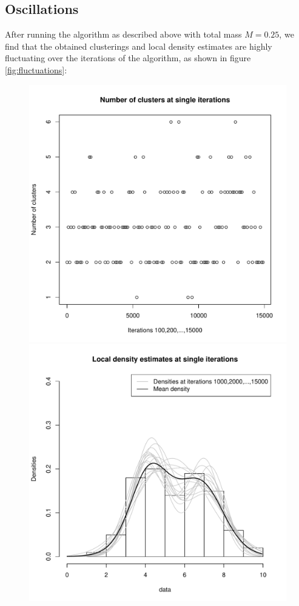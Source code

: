 \subsection{Oscillations}
After running the algorithm as described above with total mass $M=0.25$, we find that the obtained clusterings and local density estimates are highly fluctuating over the iterations of the algorithm, as shown in figure \ref{fig:fluctuations}:
\begin{figure}[h]
	\centering
	\begin{minipage}{0.5\textwidth}
		\includegraphics[scale=0.35]{etc/cardinalities_thinned.pdf}
	\end{minipage}%
	\begin{minipage}{0.5\textwidth}
		\includegraphics[scale=0.35]{etc/densities_iters.pdf}

\end{minipage}
\end{figure}
